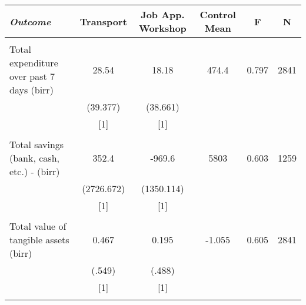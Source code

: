\begin{tabular}{lccccc} \hline
\multicolumn{1}{l}{\emph{Outcome}} & \multicolumn{1}{c}{Transport} &\multicolumn{1}{c}{Job App. Workshop} & \multicolumn{1}{c}{Control Mean} & \multicolumn{1}{c}{F} & \multicolumn{1}{c}{N} \\ \hline \\
Total expenditure over past 7 days (birr) & 28.54 & 18.18 & 474.4 & 0.797 & 2841 \\
& (39.377) & (38.661) &  &  &  \\
& [1] & [1] &  &  &  \\
&  &  &  &  &  \\
Total savings (bank, cash, etc.) - (birr) & 352.4 & -969.6 & 5803 & 0.603 & 1259 \\
& (2726.672) & (1350.114) &  &  &  \\
& [1] & [1] &  &  &  \\
&  &  &  &  &  \\
Total value of tangible assets (birr) & 0.467 & 0.195 & -1.055 & 0.605 & 2841 \\
& (.549) & (.488) &  &  &  \\
& [1] & [1] &  &  &  \\
&  &  &  &  &  \\ \hline
\end{tabular}
